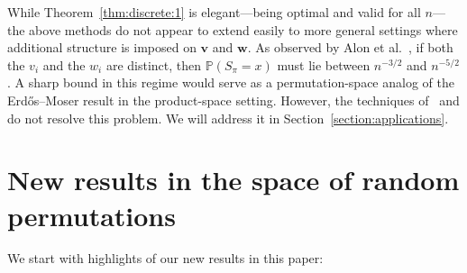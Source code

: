 \documentclass[reqno]{amsart}
\renewcommand\P{{\mathbb{P}}}
\newcommand\BMv{{\bm v}}
\newcommand\BMw{{\bm w}}
\theoremstyle{plain}
\theoremstyle{definition}
\begin{document}
While Theorem~\ref{thm:discrete:1} is elegant—being optimal and valid for all
$n$—the above methods do not appear to extend easily to more general settings
where additional structure is imposed on $\BMv$ and $\BMw$. As observed by
Alon et al.~\cite{APZ}, if both the $v_i$ and the $w_i$ are distinct,
then $\P(S_{\pi}=x)$ must lie between $n^{-3/2}$ and $n^{-5/2}$. A sharp bound
in this regime would serve as a permutation-space analog of the
Erd\H{o}s--Moser result in the product-space setting. However, the techniques
of~\cite{APZ} and \cite{Paw} do not resolve this problem. We will address it in
Section~\ref{section:applications}.



\section {New results in the space of random permutations}

We start with highlights of our new results in this paper:
\end{document}
